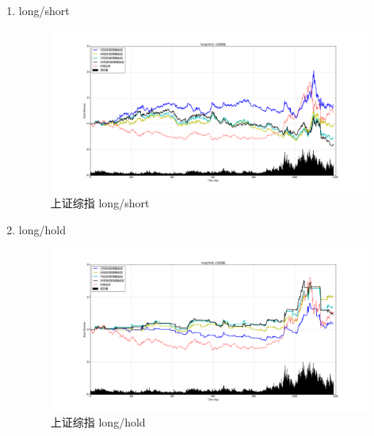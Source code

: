 \documentclass[12pt,a4paper]{article}
\begin{document}
\begin{enumerate}
\item long/short 
\begin{figure}[H]
	\centering
	\includegraphics[width=1.0\textwidth]{img_r_10/szzz.png}
	\caption{上证综指 long/short}
\end{figure}
\item long/hold 
\begin{figure}[H]
	\centering
	\includegraphics[width=1.0\textwidth]{img_r_10/szzz_1.png}
	\caption{上证综指 long/hold}
\end{figure}
\end{enumerate}
\end{document}
